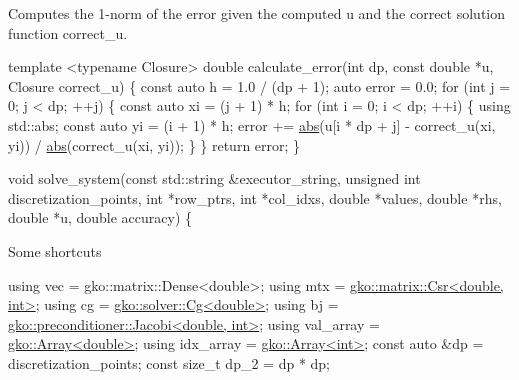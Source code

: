 Computes the 1-\/norm of the error given the computed {\ttfamily u} and the correct solution function {\ttfamily correct\+\_\+u}.


\begin{DoxyCode}
\textcolor{keyword}{template} <\textcolor{keyword}{typename} Closure>
\textcolor{keywordtype}{double} calculate\_error(\textcolor{keywordtype}{int} dp, \textcolor{keyword}{const} \textcolor{keywordtype}{double} *u, Closure correct\_u)
\{
    \textcolor{keyword}{const} \textcolor{keyword}{auto} h = 1.0 / (dp + 1);
    \textcolor{keyword}{auto} error = 0.0;
    \textcolor{keywordflow}{for} (\textcolor{keywordtype}{int} j = 0; j < dp; ++j) \{
        \textcolor{keyword}{const} \textcolor{keyword}{auto} xi = (j + 1) * h;
        \textcolor{keywordflow}{for} (\textcolor{keywordtype}{int} i = 0; i < dp; ++i) \{
            \textcolor{keyword}{using} std::abs;
            \textcolor{keyword}{const} \textcolor{keyword}{auto} yi = (i + 1) * h;
            error +=
                \hyperlink{namespacegko_a57797fc0a00fd4b7ff34ca4bfc84bc51}{abs}(u[i * dp + j] - correct\_u(xi, yi)) / \hyperlink{namespacegko_a57797fc0a00fd4b7ff34ca4bfc84bc51}{abs}(correct\_u(xi, yi));
        \}
    \}
    \textcolor{keywordflow}{return} error;
\}


\textcolor{keywordtype}{void} solve\_system(\textcolor{keyword}{const} std::string &executor\_string,
                  \textcolor{keywordtype}{unsigned} \textcolor{keywordtype}{int} discretization\_points, \textcolor{keywordtype}{int} *row\_ptrs,
                  \textcolor{keywordtype}{int} *col\_idxs, \textcolor{keywordtype}{double} *values, \textcolor{keywordtype}{double} *rhs, \textcolor{keywordtype}{double} *u,
                  \textcolor{keywordtype}{double} accuracy)
\{
\end{DoxyCode}


Some shortcuts


\begin{DoxyCode}
\textcolor{keyword}{using} vec = gko::matrix::Dense<double>;
\textcolor{keyword}{using} mtx = \hyperlink{classgko_1_1matrix_1_1Csr}{gko::matrix::Csr<double, int>};
\textcolor{keyword}{using} cg = \hyperlink{classgko_1_1solver_1_1Cg}{gko::solver::Cg<double>};
\textcolor{keyword}{using} bj = \hyperlink{classgko_1_1preconditioner_1_1Jacobi}{gko::preconditioner::Jacobi<double, int>};
\textcolor{keyword}{using} val\_array = \hyperlink{classgko_1_1Array}{gko::Array<double>};
\textcolor{keyword}{using} idx\_array = \hyperlink{classgko_1_1Array}{gko::Array<int>};
\textcolor{keyword}{const} \textcolor{keyword}{auto} &dp = discretization\_points;
\textcolor{keyword}{const} \textcolor{keywordtype}{size\_t} dp\_2 = dp * dp;
\end{DoxyCode}


